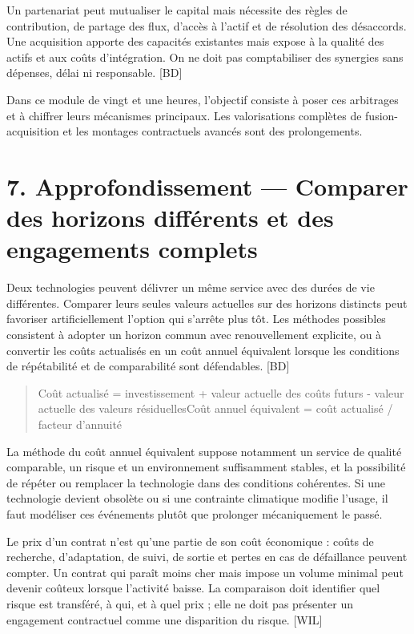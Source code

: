 \documentclass[12pt,a4paper]{article}
\begin{document}
Un partenariat peut mutualiser le capital mais nécessite des règles de contribution, de partage des flux, d’accès à l’actif et de résolution des désaccords. Une acquisition apporte des capacités existantes mais expose à la qualité des actifs et aux coûts d’intégration. On ne doit pas comptabiliser des synergies sans dépenses, délai ni responsable. [BD]


Dans ce module de vingt et une heures, l’objectif consiste à poser ces arbitrages et à chiffrer leurs mécanismes principaux. Les valorisations complètes de fusion-acquisition et les montages contractuels avancés sont des prolongements.

\section*{7. Approfondissement --- Comparer des horizons différents et des engagements complets}
Deux technologies peuvent délivrer un même service avec des durées de vie différentes. Comparer leurs seules valeurs actuelles sur des horizons distincts peut favoriser artificiellement l’option qui s’arrête plus tôt. Les méthodes possibles consistent à adopter un horizon commun avec renouvellement explicite, ou à convertir les coûts actualisés en un coût annuel équivalent lorsque les conditions de répétabilité et de comparabilité sont défendables. [BD]



\begin{quote}\small Coût actualisé = investissement + valeur actuelle des coûts futurs - valeur actuelle des valeurs résiduelles\newline Coût annuel équivalent = coût actualisé / facteur d’annuité\end{quote}

La méthode du coût annuel équivalent suppose notamment un service de qualité comparable, un risque et un environnement suffisamment stables, et la possibilité de répéter ou remplacer la technologie dans des conditions cohérentes. Si une technologie devient obsolète ou si une contrainte climatique modifie l’usage, il faut modéliser ces événements plutôt que prolonger mécaniquement le passé.


Le prix d’un contrat n’est qu’une partie de son coût économique : coûts de recherche, d’adaptation, de suivi, de sortie et pertes en cas de défaillance peuvent compter. Un contrat qui paraît moins cher mais impose un volume minimal peut devenir coûteux lorsque l’activité baisse. La comparaison doit identifier quel risque est transféré, à qui, et à quel prix ; elle ne doit pas présenter un engagement contractuel comme une disparition du risque. [WIL]
\end{document}
